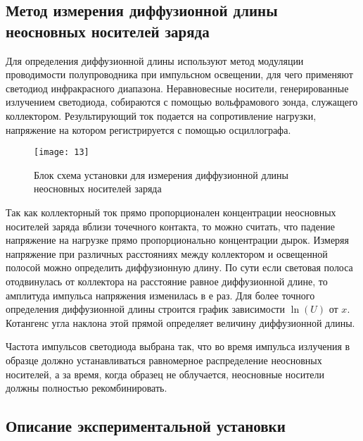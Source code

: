 \documentclass[a4paper,12pt]{article}
\begin{document}
\subsection{Метод измерения диффузионной длины неосновных носителей заряда}

Для определения диффузионной длины используют метод модуляции проводимости полупроводника при импульсном освещении, для чего применяют светодиод инфракрасного диапазона. Неравновесные носители, генерированные излучением светодиода, собираются с помощью вольфрамового зонда, служащего коллектором. Результирующий ток подается на сопротивление нагрузки, напряжение на котором регистрируется с помощью осциллографа.

\begin{figure}[H]
	\centering
	\texttt{[image: 13]}
	\caption{Блок схема установки для измерения диффузионной длины неосновных носителей заряда}
	\label{fig:figure12}
\end{figure}


Так как коллекторный ток прямо пропорционален концентрации неосновных носителей заряда вблизи точечного контакта, то можно считать, что падение напряжение на нагрузке прямо пропорционально концентрации дырок. Измеряя напряжение при различных расстояниях между коллектором и освещенной полосой можно определить диффузионную длину. По сути если световая полоса отодвинулась от коллектора на расстояние равное диффузионной длине, то амплитуда импульса напряжения изменилась в $е$ раз. Для более точного определения диффузионной длины строится график зависимости $\ln(U)$ от $x$. Котангенс угла наклона этой прямой определяет величину диффузионной длины.

Частота импульсов светодиода выбрана так, что во время импульса излучения в образце должно устанавливаться равномерное распределение неосновных носителей, а за время, когда образец не облучается, неосновные носители должны полностью рекомбинировать.

\subsection{Описание экспериментальной установки}
\end{document}
